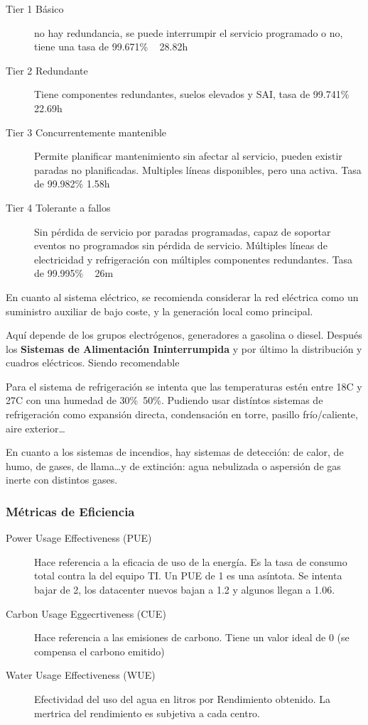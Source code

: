     \begin{description}
        \item[Tier 1 Básico] no hay redundancia, se puede interrumpir el servicio programado o no, tiene una tasa  de 99.671\% ~ 28.82h
        \item[Tier 2 Redundante] Tiene componentes redundantes, suelos elevados y SAI, tasa de 99.741\% ~ 22.69h
        \item[Tier 3 Concurrentemente mantenible] Permite planificar mantenimiento sin afectar al servicio, pueden existir paradas no planificadas. Multiples líneas disponibles, pero una activa. Tasa de 99.982\% 1.58h
        \item[Tier 4 Tolerante a fallos] Sin pérdida de servicio por paradas programadas, capaz de soportar eventos no programados sin pérdida de servicio. Múltiples líneas de electricidad y refrigeración con múltiples componentes redundantes. Tasa de 99.995\% ~ 26m
    \end{description}

    En cuanto al sistema eléctrico, se recomienda considerar la red eléctrica como un suministro auxiliar de bajo coste, y la generación local como principal.

    Aquí depende de los grupos electrógenos, generadores a gasolina o diesel. Después los \textbf{Sistemas de Alimentación Ininterrumpida} y por último la distribución y cuadros eléctricos. Siendo recomendable 

    Para el sistema de refrigeración se intenta que las temperaturas estén entre 18C y 27C con una humedad de 30\%~50\%. Pudiendo usar distíntos sistemas de refrigeración como expansión directa, condensación en torre, pasillo frío/caliente, aire exterior\dots

    En cuanto a los sistemas de incendios, hay sistemas de detección: de calor, de humo, de gases, de llama\dots y de extinción: agua nebulizada o aspersión de gas inerte con distintos gases.

\subsubsection{Métricas de Eficiencia}
    \begin{description}
        \item[Power Usage Effectiveness (PUE)] Hace referencia a la eficacia de uso de la energía. Es la tasa de consumo total contra la del equipo TI. Un PUE de 1 es una asíntota. Se intenta bajar de 2, los datacenter nuevos bajan a 1.2 y algunos llegan a 1.06.
        \item[Carbon Usage Eggecrtiveness (CUE)] Hace referencia a las emisiones de carbono. Tiene un valor ideal de 0 (se compensa el carbono emitido)
        \item[Water Usage Effectiveness (WUE)] Efectividad del uso del agua en litros por Rendimiento obtenido. La mertrica del rendimiento es subjetiva a cada centro.
    \end{description}